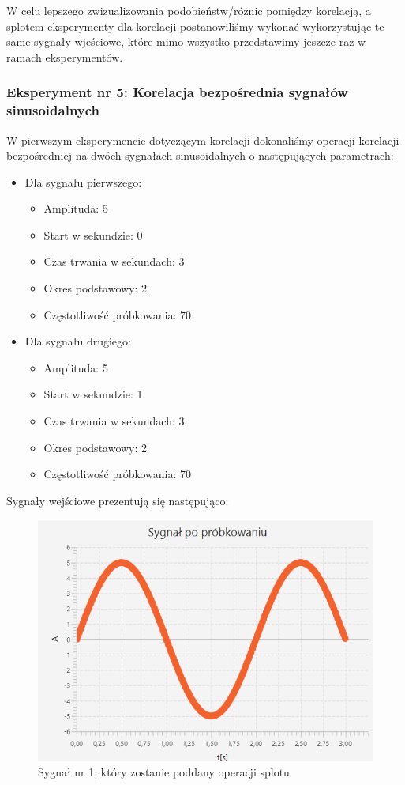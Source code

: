 \documentclass[12pt]{article}
\begin{document}
W celu lepszego zwizualizowania podobieństw/różnic pomiędzy korelacją, a splotem eksperymenty dla korelacji postanowiliśmy wykonać wykorzystując te same sygnały wjeściowe, które mimo wszystko przedstawimy jeszcze raz w ramach eksperymentów.

\subsubsection{Eksperyment nr 5: Korelacja bezpośrednia sygnałów sinusoidalnych}
W pierwszym eksperymencie dotyczącym korelacji dokonaliśmy operacji korelacji bezpośredniej na dwóch sygnałach sinusoidalnych o następujących parametrach:
\begin{itemize}
    \item Dla sygnału pierwszego: 
    \begin{itemize}
        \item Amplituda: 5
        \item Start w sekundzie: 0
        \item Czas trwania w sekundach: 3
        \item Okres podstawowy: 2
        \item Częstotliwość próbkowania: 70
    \end{itemize}
    \item Dla sygnału drugiego:
    \begin{itemize}
        \item Amplituda: 5
        \item Start w sekundzie: 1
        \item Czas trwania w sekundach: 3
        \item Okres podstawowy: 2
        \item Częstotliwość próbkowania: 70
    \end{itemize}
\end{itemize}
Sygnały wejściowe prezentują się następująco:
\begin{figure}[H]
    \centering
	\includegraphics[width=\linewidth]{sygnal_po_probkowaniu_1.1.png}
    \caption{Sygnał nr 1, który zostanie poddany operacji splotu}
    \label{Sygnał_5.1}
\end{figure}
\end{document}
